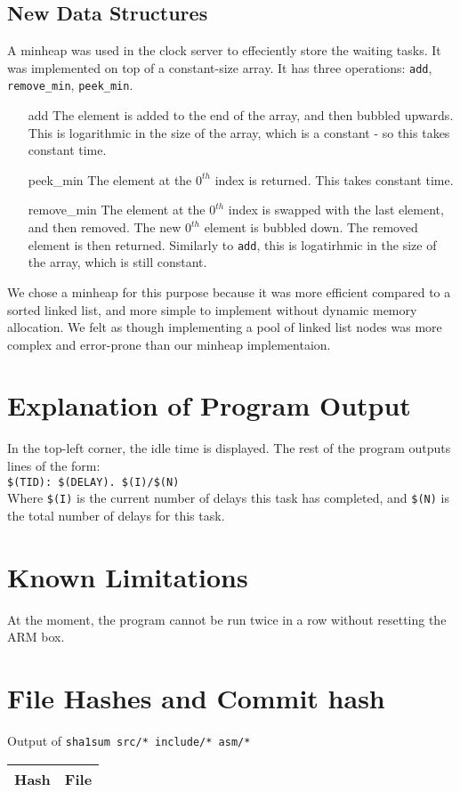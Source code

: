 \documentclass{article}
\begin{document}
\subsection{New Data Structures}
    A minheap was used in the clock server to effeciently store the waiting tasks. It was implemented on top of a constant-size array. It has three operations: \verb|add|, \verb|remove_min|, \verb|peek_min|.
\begin{enumerate}
    \item[add] The element is added to the end of the array, and then bubbled upwards. This is logarithmic in the size of the array, which is a constant - so this takes constant time.
    \item[peek\_min] The element at the $0^{th}$ index is returned. This takes constant time.
    \item[remove\_min] The element at the $0^{th}$ index is swapped with the last element, and then removed. The new $0^{th}$ element is bubbled down. The removed element is then returned.
    Similarly to \verb|add|, this is logatirhmic in the size of the array, which is still constant.
\end{enumerate}

    We chose a minheap for this purpose because it was more efficient compared to a sorted linked list, and more simple to implement without dynamic memory allocation. We felt as though implementing a pool of linked list nodes was more complex and error-prone than our minheap implementaion.
\section{Explanation of Program Output}
    In the top-left corner, the idle time is displayed. The rest of the program outputs lines of the form:\\
    \verb|$(TID): $(DELAY). $(I)/$(N)|\\
    Where \verb|$(I)| is the current number of delays this task has completed, and \verb|$(N)| is the total number of delays for this task. 
\section{Known Limitations}
    At the moment, the program cannot be run twice in a row without resetting the ARM box.
\section{File Hashes and Commit hash}
\begin{minipage}{\textwidth}
Output of \verb|sha1sum src/* include/* asm/*|

\begin{tabular}{|c|l|}
\hline
Hash & File\\
\hline
\hline
\end{tabular}
\end{minipage}
\end{document}
